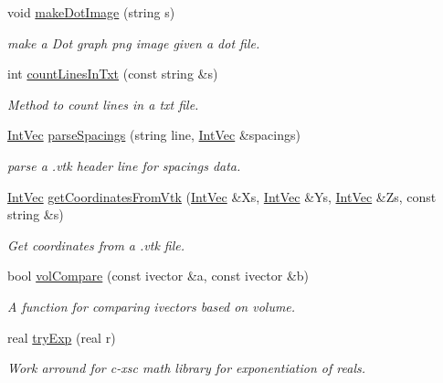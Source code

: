 \begin{DoxyCompactItemize}
void \hyperlink{namespacesubpavings_abb4671c14005974aeea8f0dd39600ec6}{make\-Dot\-Image} (string s)
\begin{DoxyCompactList}\small\item\em make a \-Dot graph png image given a dot file. \end{DoxyCompactList}\item 
int \hyperlink{namespacesubpavings_a5928e5a1c7fc26e6df9c5bf9eb4a37a2}{count\-Lines\-In\-Txt} (const string \&s)
\begin{DoxyCompactList}\small\item\em \-Method to count lines in a txt file. \end{DoxyCompactList}\item 
\hyperlink{namespacesubpavings_aed8e75b2af342b9c1460431c223dca8e}{\-Int\-Vec} \hyperlink{namespacesubpavings_a498313e6b9ea0e6fb60d63ea3f2d0128}{parse\-Spacings} (string line, \hyperlink{namespacesubpavings_aed8e75b2af342b9c1460431c223dca8e}{\-Int\-Vec} \&spacings)
\begin{DoxyCompactList}\small\item\em parse a .vtk header line for spacings data. \end{DoxyCompactList}\item 
\hyperlink{namespacesubpavings_aed8e75b2af342b9c1460431c223dca8e}{\-Int\-Vec} \hyperlink{namespacesubpavings_ab55a3f1bfa1cae218886328f19b2208f}{get\-Coordinates\-From\-Vtk} (\hyperlink{namespacesubpavings_aed8e75b2af342b9c1460431c223dca8e}{\-Int\-Vec} \&\-Xs, \hyperlink{namespacesubpavings_aed8e75b2af342b9c1460431c223dca8e}{\-Int\-Vec} \&\-Ys, \hyperlink{namespacesubpavings_aed8e75b2af342b9c1460431c223dca8e}{\-Int\-Vec} \&\-Zs, const string \&s)
\begin{DoxyCompactList}\small\item\em \-Get coordinates from a .vtk file. \end{DoxyCompactList}\item 
bool \hyperlink{namespacesubpavings_a19b79319876fc25305936396f24e5a6c}{vol\-Compare} (const ivector \&a, const ivector \&b)
\begin{DoxyCompactList}\small\item\em \-A function for comparing ivectors based on volume. \end{DoxyCompactList}\item 
real \hyperlink{namespacesubpavings_ada0daf400b54e571b4f8d83bd32861c5}{try\-Exp} (real r)
\begin{DoxyCompactList}\small\item\em \-Work arround for c-\/xsc math library for exponentiation of reals. \end{DoxyCompactList}\item 

\end{DoxyCompactItemize}
